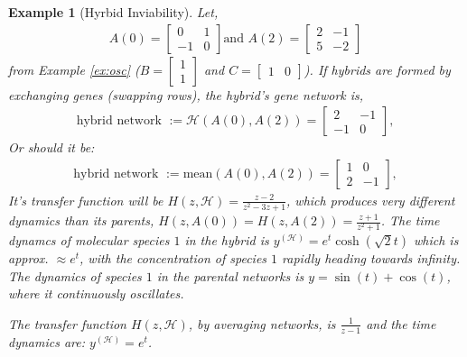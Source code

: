 \documentclass[11 pt]{article}
\newcommand{\jss}[1]{{\color{olive}\it #1}}
\newtheorem{example}{Example}
\begin{document}
\begin{example}[Hyrbid Inviability]
  Let, \begin{align*}
    A(0) =\left[\begin{matrix}
      0 & 1 \\
      -1 & 0
    \end{matrix}\right]
    \text{and }
    A(2) = \left[\begin{matrix}
      2 & -1 \\
      5 & -2
    \end{matrix}\right]
  \end{align*}
  from Example \ref{ex:osc} ($B=\begin{bmatrix} 1 \\ 1 \end{bmatrix}$ and $C=\begin{bmatrix} 1 & 0 \end{bmatrix}$). 
If hybrids are formed by exchanging genes (swapping rows), the hybrid's gene network is,
  \begin{align*}
    \text{hybrid network } := \mathcal{H}(A(0), A(2)) = \left[\begin{matrix}
      2 & -1 \\
      -1 & 0
    \end{matrix}\right] ,
  \end{align*}
  \jss{ Or should it be: \begin{align*}
    \text{hybrid network } := \text{mean}(A(0), A(2)) = \left[\begin{matrix}
      1 & 0 \\
      2 & -1
    \end{matrix}\right] ,
  \end{align*} }
  It's transfer function will be $H(z, \mathcal{H}) = \frac{z-2}{z^2 - 3z +1}$, which produces very different dynamics than its parents, $H(z, A(0)) = H(z, A(2)) = \frac{z+1}{z^2 + 1}$. The time dynamcs of molecular species $1$ in the hybrid is $y^{(\mathcal{H})} =e^{t} \cosh(\sqrt{2} t)$ \jss{ which is approx. $\approx e^{t}$}, with the concentration of species $1$ rapidly heading towards infinity. The dynamics of species $1$ in the parental networks is $y = \sin(t) + \cos(t)$, where it continuously oscillates.

  \jss{The transfer function $H(z, \mathcal{H})$, by averaging networks, is $\frac{1}{z-1}$ and the time dynamics are: $y^{(\mathcal{H})} = e^{t}$.}
\end{example}
\end{document}
